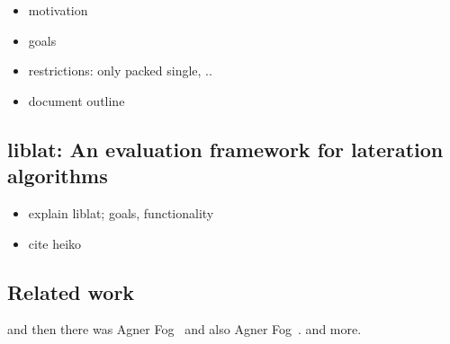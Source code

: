 \begin{itemize}
\item motivation
\item goals
\item restrictions: only packed single, ..
\item document outline
\end{itemize}
\subsection{liblat: An evaluation framework for lateration algorithms}
\begin{itemize}
\item explain liblat; goals, functionality
\item cite heiko
\end{itemize}
\subsection{Related work}
and then there was Agner Fog~\cite{fog2011optimizing} and also Agner Fog~\cite{fog2011instructiontables}. and more.

